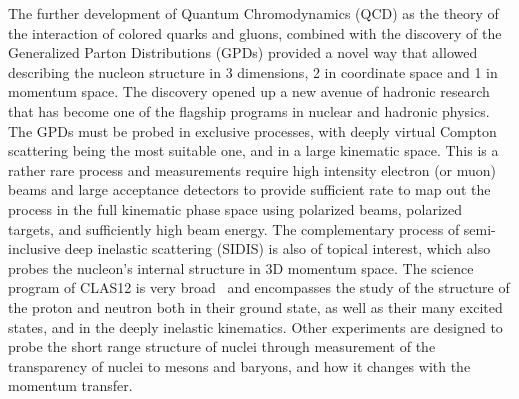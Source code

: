 \documentclass[final,3p,times,twocolumn,authoryear]{elsarticle}
\begin{document}
The further development of Quantum Chromodynamics (QCD) as the theory of the interaction of colored quarks and gluons,
combined with the discovery of the Generalized Parton Distributions (GPDs) provided a novel way that allowed describing the
nucleon structure in 3 dimensions, 2 in coordinate space and 1 in momentum space. The discovery opened up a new avenue of
hadronic research that has become one of the flagship programs in nuclear and hadronic physics. The GPDs must be probed in
exclusive processes, with deeply virtual Compton scattering being the most suitable one, and in a large kinematic space. This is
a rather rare process and measurements require high intensity electron (or muon) beams and large acceptance detectors to
provide sufficient rate to map out the process in the full kinematic phase space using polarized beams, polarized targets, and
sufficiently high beam energy. The complementary process of semi-inclusive deep inelastic scattering (SIDIS) is also of topical
interest,  which also probes the nucleon's internal structure in 3D momentum space. The science program of CLAS12 is very
broad~\cite{Burkert:2018nvj} and encompasses the study of the structure of the proton and neutron both in their ground state,
as well as their many excited states, and in the deeply inelastic kinematics. Other experiments are designed to probe the short
range structure of nuclei through measurement of the transparency of nuclei to mesons and baryons, and how it changes with
the momentum transfer.   
\end{document}
